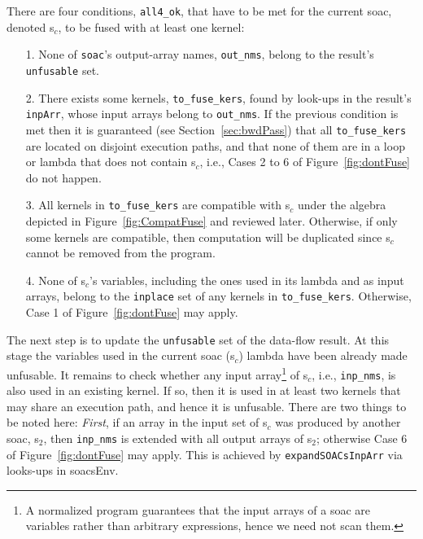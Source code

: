 \documentclass{sigplanconf}  %
\newcommand{\emp}[1]{\textcolor{DikuRed}{ #1}}
\newcommand{\emphh}[1]{\textcolor{CosGreen}{ #1}}
\begin{document}
There are four conditions, {\tt all4\_ok}, that have to be met for the 
current {\sc soac}, denoted {\sc s}$_c$, to be fused with at least one kernel: %
\begin{itemize}
    \item [1.] None of {\tt soac}'s output-array names, {\tt out\_nms}, 
                belong to the result's {\tt unfusable} set.
    \item [2.] There exists some kernels, {\tt to\_fuse\_kers}, found by look-ups
                in the result's {\tt inpArr}, whose input arrays belong to {\tt out\_nms}.
                If the previous condition is met then it is guaranteed (see Section~\ref{sec:bwdPass}) 
                that all {\tt to\_fuse\_kers} are located on disjoint execution paths,
                and that none of them are in a loop or lambda 
                that does not contain {\sc s}$_c$, 
                i.e., \emp{Cases 2 to 6} of Figure~\ref{fig:dontFuse} do not happen.
    \item [3.] All kernels in {\tt to\_fuse\_kers} are compatible with 
                    {\sc s}$_c$ under the algebra depicted 
                    in Figure~\ref{fig:CompatFuse} and reviewed later. 
               Otherwise, if only some kernels are compatible, then computation
                will be duplicated since {\sc s}$_c$ cannot be removed
                from the program.
    \item [4.] None of {\sc s}$_c$'s variables, including the
                ones used in its lambda and as input arrays, belong to the 
                {\tt inplace} set of any kernels in {\tt to\_fuse\_kers}.
                Otherwise, \emp{Case 1} of Figure~\ref{fig:dontFuse} may apply.
\end{itemize}

The next step is to update the {\tt unfusable} set of the data-flow result.
At this stage the variables used in the current {\sc soac} ({\sc s}$_c$) lambda
have been already made unfusable. It remains to check whether any input
array\footnote{
A normalized program guarantees that the input arrays of a {\sc soac}
are variables rather than arbitrary expressions, hence we need not scan them.
} of {\sc s}$_c$, i.e., {\tt inp\_nms}, is also used in an 
existing kernel. If so, then it is used in at least two kernels that may
share an execution path, and hence it is unfusable. There are two things 
to be noted here:
{\em First}, if an array in the input set of {\sc s}$_c$
was produced by another {\sc soac}, {\sc s}$_2$, then {\tt inp\_nms} is
extended with all output arrays of {\sc s}$_2$; otherwise \emp{Case 6} 
of Figure~\ref{fig:dontFuse} may apply. This is achieved by
{\tt expandSOACsInpArr} via looks-ups in \emphh{soacsEnv}. 
\end{document}

